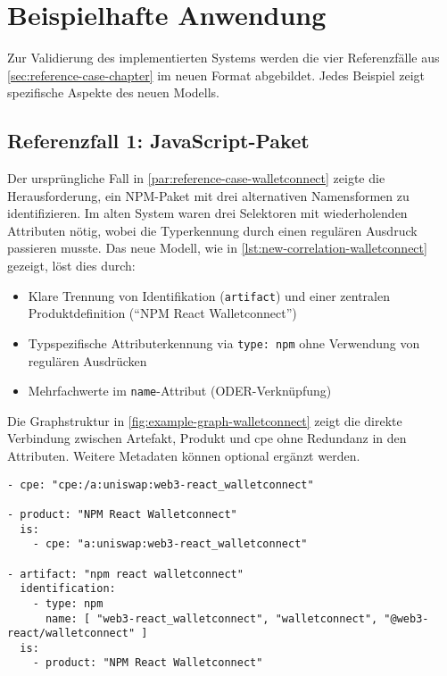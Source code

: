 \section{Beispielhafte Anwendung}\label{sec:beispiele-fertige-implementierung}

Zur Validierung des implementierten Systems werden die vier Referenzfälle aus \autoref{sec:reference-case-chapter} im neuen Format abgebildet.
Jedes Beispiel zeigt spezifische Aspekte des neuen Modells.

\subsection{Referenzfall 1: JavaScript-Paket}\label{subsec:example-js-package}

Der ursprüngliche Fall in \autoref{par:reference-case-walletconnect} zeigte die Herausforderung, ein NPM-Paket mit drei alternativen Namensformen zu identifizieren.
Im alten System waren drei Selektoren mit wiederholenden Attributen nötig, wobei die Typerkennung durch einen regulären Ausdruck passieren musste.
Das neue Modell, wie in \autoref{lst:new-correlation-walletconnect} gezeigt, löst dies durch:

\begin{itemize}
    \itemsep0em
    \item Klare Trennung von Identifikation (\texttt{artifact}) und einer zentralen Produktdefinition (\enquote{NPM React Walletconnect})
    \item Typspezifische Attributerkennung via \texttt{type: npm} ohne Verwendung von regulären Ausdrücken
    \item Mehrfachwerte im \texttt{name}-Attribut (ODER-Verknüpfung)
\end{itemize}

Die Graphstruktur in \autoref{fig:example-graph-walletconnect} zeigt die direkte Verbindung zwischen Artefakt, Produkt und \acrshort{cpe} ohne Redundanz in den Attributen.
Weitere Metadaten können optional ergänzt werden.

\begin{lstlisting}[style=yaml,caption={Produktmodellierung zu react-walletconnect},label={lst:new-correlation-walletconnect},basicstyle=\ttfamily\scriptsize]
- cpe: "cpe:/a:uniswap:web3-react_walletconnect"

- product: "NPM React Walletconnect"
  is:
    - cpe: "a:uniswap:web3-react_walletconnect"

- artifact: "npm react walletconnect"
  identification:
    - type: npm
      name: [ "web3-react_walletconnect", "walletconnect", "@web3-react/walletconnect" ]
  is:
    - product: "NPM React Walletconnect"
\end{lstlisting}

